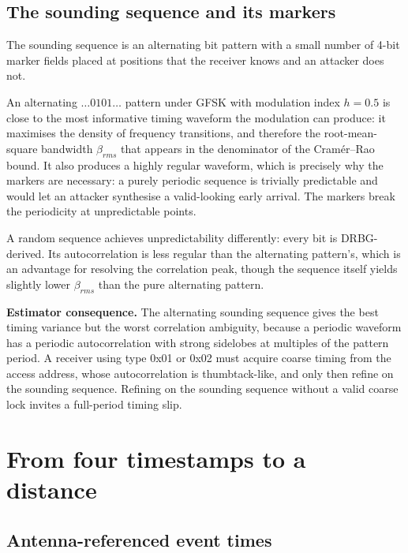 \documentclass[11pt,a4paper]{article}
\begin{document}
\subsection{The sounding sequence and its markers}

The sounding sequence is an alternating bit pattern with a small number of 4-bit marker fields
placed at positions that the receiver knows and an attacker does not.

An alternating $\ldots0101\ldots$ pattern under GFSK with modulation index $h=0.5$ is close to the
most informative timing waveform the modulation can produce: it maximises the density of frequency
transitions, and therefore the root-mean-square bandwidth $\beta_{rms}$ that appears in the
denominator of the Cram\'er--Rao bound. It also produces a highly regular waveform, which is
precisely why the markers are necessary: a purely periodic sequence is trivially predictable and
would let an attacker synthesise a valid-looking early arrival. The markers break the periodicity
at unpredictable points.

A random sequence achieves unpredictability differently: every bit is DRBG-derived. Its
autocorrelation is less regular than the alternating pattern's, which is an advantage for
resolving the correlation peak, though the sequence itself yields slightly lower $\beta_{rms}$ than
the pure alternating pattern.

\begin{callout}
\textbf{Estimator consequence.} The alternating sounding sequence gives the best timing variance
but the worst correlation ambiguity, because a periodic waveform has a periodic autocorrelation
with strong sidelobes at multiples of the pattern period. A receiver using type 0x01 or 0x02 must
acquire coarse timing from the access address, whose autocorrelation is thumbtack-like, and only
then refine on the sounding sequence. Refining on the sounding sequence without a valid coarse
lock invites a full-period timing slip.
\end{callout}

\section{From four timestamps to a distance}
\label{sec:rtt}

\subsection{Antenna-referenced event times}
\end{document}
